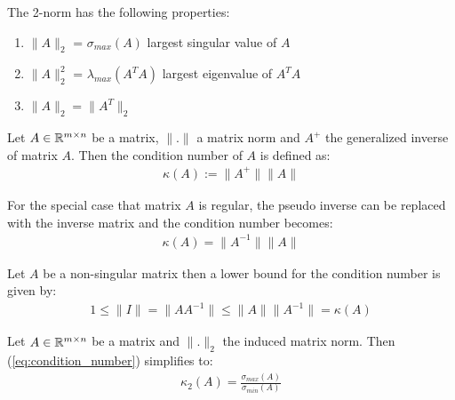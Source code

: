 \begin{remark}
	The 2-norm has the following properties:
	\begin{enumerate}
		\item $\lVert A \rVert_2$ = $\sigma_{max}(A)$ \hfill largest singular value of $A$
		\item $\lVert A \rVert_2^2$ = $\lambda_{max}(A^T A)$ \hfill largest eigenvalue of $A^T A$
		\item $\lVert A \rVert_2 = \lVert A^T \rVert_2$
	\end{enumerate}
\end{remark}

\begin{definition}
	Let $A \in \mathbb{R}^{m \times n}$ be a matrix, $\lVert . \rVert$ a matrix norm and $A^+$ the generalized inverse of matrix $A$. Then the condition number of $A$ is defined as:	
	\begin{align}\label{eq:condition_number}
	\kappa(A) := \lVert A^+ \rVert \lVert A \rVert
	\end{align}
\end{definition}

\begin{remark}
	For the special case that matrix $A$ is regular, the pseudo inverse can be replaced with the inverse matrix and the condition number becomes:
	\begin{align}
	\kappa(A) = \lVert A^{-1} \rVert \lVert A \rVert
	\end{align}	
\end{remark}

\begin{remark}
	Let $A$ be a non-singular matrix then a lower bound for the condition number is given by: 
	\begin{align*}
	 1 \leq \lVert I \rVert = \lVert A A^{-1} \rVert \leq \lVert A \rVert \lVert A^{-1} \rVert = \kappa(A)
	\end{align*}
\end{remark}

\begin{remark}
	Let $A \in \mathbb{R}^{m \times n}$ be a matrix and $\lVert . \rVert_2$ the induced matrix norm. Then (\ref{eq:condition_number}) simplifies to: 
	\begin{align*}
		\kappa_2(A) = \frac{\sigma_{max}(A)}{\sigma_{min}(A)}
	\end{align*}	
\end{remark}


